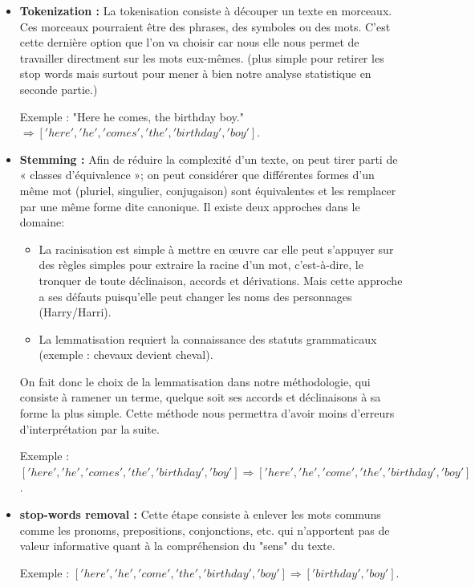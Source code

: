 \documentclass[11pt]{article}
\begin{document}
\begin{itemize}
    \renewcommand{\labelitemi}{$\bullet$}
    \item \textbf{Tokenization :} La tokenisation consiste à découper un texte en morceaux. Ces morceaux pourraient être des phrases, des symboles ou des mots. C’est cette dernière option que l’on va choisir car nous elle nous permet de travailler directment sur les mots eux-mêmes. (plus simple pour retirer les stop words mais surtout pour mener à bien notre analyse statistique en seconde partie.)\par
    Exemple : "Here he comes, the birthday boy." $\Rightarrow ['here', 'he', 'comes', 'the', 'birthday', 'boy']$.

    \item \textbf{Stemming :} Afin de réduire la complexité d’un texte, on peut tirer parti de « classes d’équivalence »; on peut considérer que différentes formes d’un même mot (pluriel, singulier, conjugaison) sont équivalentes et les remplacer par une même forme dite canonique. Il existe deux approches dans le domaine:

        \begin{itemize}
            \renewcommand{\labelitemii}{-}
            \item La racinisation est simple à mettre en œuvre car elle peut s’appuyer sur des règles simples pour extraire la racine d’un mot, c’est-à-dire, le tronquer de toute déclinaison, accords et dérivations. Mais cette approche a ses défauts puisqu’elle peut changer les noms des personnages (Harry/Harri).

            \item La lemmatisation requiert la connaissance des statuts grammaticaux (exemple : chevaux devient cheval).
        \end{itemize}

    On fait donc le choix de la lemmatisation dans notre méthodologie, qui consiste à ramener un terme, quelque soit ses accords et déclinaisons à sa forme la plus simple. Cette méthode nous permettra d'avoir moins d'erreurs d'interprétation par la suite.\par
    Exemple : $['here', 'he', 'comes', 'the', 'birthday', 'boy'] \Rightarrow ['here', 'he', 'come', 'the', 'birthday', 'boy']$.

    \item \textbf{stop-words removal :} Cette étape consiste à enlever les mots communs comme les pronoms, prepositions, conjonctions, etc. qui n'apportent pas de valeur informative quant à la compréhension du "sens" du texte.\par
    Exemple : $['here', 'he', 'come', 'the', 'birthday', 'boy'] \Rightarrow ['birthday', 'boy']$.
\end{itemize}
\end{document}
